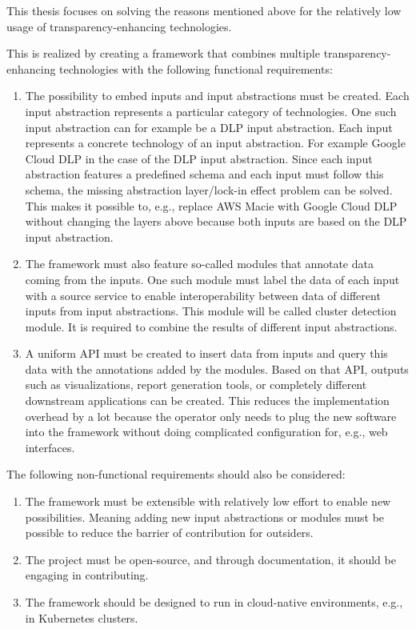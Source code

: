 


\graphicspath{{5/figures/}}

This thesis focuses on solving the reasons mentioned above for the relatively low usage of transparency-enhancing technologies.

This is realized by creating a framework that combines multiple transparency-enhancing technologies with the following functional requirements:
\begin{enumerate}
    \item The possibility to embed inputs and input abstractions must be created. Each input abstraction represents a particular category of technologies. One such input abstraction can for example be a DLP input abstraction. Each input represents a concrete technology of an input abstraction. For example Google Cloud DLP in the case of the DLP input abstraction. Since each input abstraction features a predefined schema and each input must follow this schema, the missing abstraction layer/lock-in effect problem can be solved. This makes it possible to, e.g., replace AWS Macie with Google Cloud DLP without changing the layers above because both inputs are based on the DLP input abstraction.
    \item The framework must also feature so-called modules that annotate data coming from the inputs. One such module must label the data of each input with a source service to enable interoperability between data of different inputs from input abstractions. This module will be called cluster detection module. It is required to combine the results of different input abstractions.
    \item A uniform API must be created to insert data from inputs and query this data with the annotations added by the modules. Based on that API, outputs such as visualizations, report generation tools, or completely different downstream applications can be created. This reduces the implementation overhead by a lot because the operator only needs to plug the new software into the framework without doing complicated configuration for, e.g., web interfaces.
\end{enumerate}
The following non-functional requirements should also be considered:
\begin{enumerate}
    \item The framework must be extensible with relatively low effort to enable new possibilities. Meaning adding new input abstractions or modules must be possible to reduce the barrier of contribution for outsiders. 
    \item The project must be open-source, and through documentation, it should be engaging in contributing.
    \item The framework should be designed to run in cloud-native environments, e.g., in Kubernetes clusters.
\end{enumerate}

